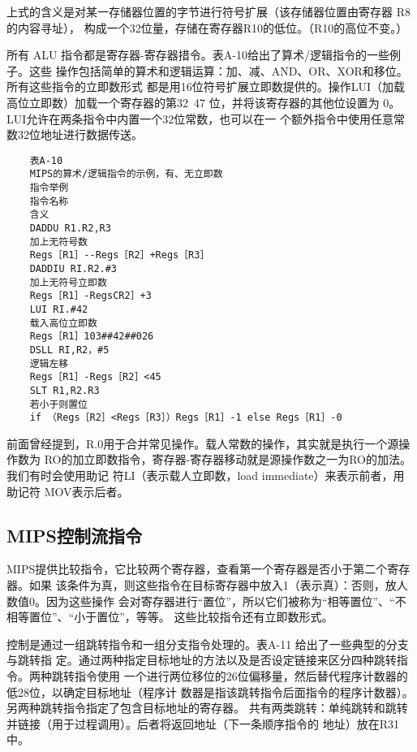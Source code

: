上式的含义是对某一存储器位置的字节进行符号扩展（该存储器位置由寄存器 R8的内容寻址），
构成一个32位量，存储在寄存器R10的低位。（R10的高位不变。）

所有 ALU 指令都是寄存器-寄存器措令。表A-10给出了算术/逻辑指令的一些例子。这些
操作包括简单的算术和逻辑运算：加、减、AND、OR、XOR和移位。所有这些指令的立即数形式
都是用16位符号扩展立即数提供的。操作LUI（加载高位立即数）加载一个寄存器的第32~47
位，并将该寄存器的其他位设置为 0。LUI允许在两条指令中内置一个32位常数，也可以在一
个额外指令中使用任意常数32位地址进行数据传送。

\begin{verbatim}
    表A-10
    MIPS的算术/逻辑指令的示例，有、无立即数
    指令举例
    指令名称
    含义
    DADDU R1.R2,R3
    加上无符号数
    Regs［R1］--Regs［R2］+Regs［R3］
    DADDIU RI.R2.#3
    加上无符号立即数
    Regs［R1］-RegsCR2］+3
    LUI RI.#42
    载入高位立即数
    Regs［R1］103##42##026
    DSLL RI,R2，#5
    逻辑左移
    Regs［R1］-Regs［R2］<45
    SLT R1,R2.R3
    若小于则置位
    if （Regs［R2］<Regs［R3］）Regs［R1］-1 else Regs［R1］-0
\end{verbatim}
前面曾经提到，R.0用于合并常见操作。载人常数的操作，其实就是执行一个源操作数为
RO的加立即数指令，寄存器-寄存器移动就是源操作数之一为RO的加法。我们有时会使用助记
符LI（表示载人立即数，load immediate）来表示前者，用助记符 MOV表示后者。

\subsection{MIPS控制流指令}

MIPS提供比较指令，它比较两个寄存器，查看第一个寄存器是否小于第二个寄存器。如果
该条件为真，则这些指令在目标寄存器中放入1（表示真）：否则，放人数值0。因为这些操作
会对寄存器进行“置位”，所以它们被称为“相等置位”、“不相等置位”、“小于置位”，等等。
这些比较指令还有立即数形式。

控制是通过一组跳转指令和一组分支指令处理的。表A-11 给出了一些典型的分支与跳转指
定。通过两种指定目标地址的方法以及是否设定链接来区分四种跳转指令。两种跳转指令使用
一个进行两位移位的26位偏移量，然后替代程序计数器的低28位，以确定目标地址（程序计
数器是指该跳转指令后面指令的程序计数器）。另两种跳转指令指定了包含目标地址的寄存器。
共有两类跳转：单纯跳转和跳转并链接（用于过程调用）。后者将返回地址（下一条顺序指令的
地址）放在R31中。

